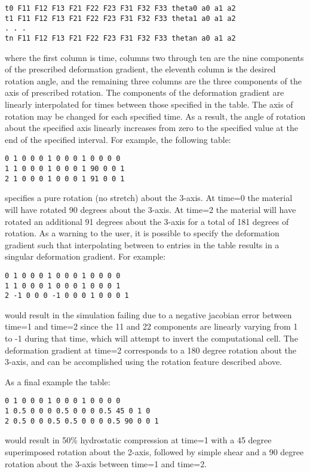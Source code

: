 \begin{Verbatim}
t0 F11 F12 F13 F21 F22 F23 F31 F32 F33 theta0 a0 a1 a2
t1 F11 F12 F13 F21 F22 F23 F31 F32 F33 theta1 a0 a1 a2
. . .
tn F11 F12 F13 F21 F22 F23 F31 F32 F33 thetan a0 a1 a2

\end{Verbatim}
where the first column is time, columns two through ten are the nine components of the prescribed deformation gradient, the eleventh column is the desired rotation angle, and the remaining three columns are the three components of the axis of prescribed rotation.  The components of the deformation gradient are linearly interpolated for times between those specified in the table.  The axis of rotation may be changed for each specified time.  As a result, the angle of rotation about the specified axis linearly increases from zero to the specified value at the end of the specified interval.  For example, the following table:

\begin{Verbatim}
0 1 0 0 0 1 0 0 0 1 0 0 0 0
1 1 0 0 0 1 0 0 0 1 90 0 0 1
2 1 0 0 0 1 0 0 0 1 91 0 0 1
\end{Verbatim}
specifies a pure rotation (no stretch) about the 3-axis.  At time=0 the material will have rotated 90 degrees about the 3-axis.  At time=2 the material will have rotated an additional 91 degrees about the 3-axis for a total of 181 degrees of rotation.  As a warning to the user, it is possible to specify the deformation gradient such that interpolating between to entries in the table results in a singular deformation gradient.  For example:
\begin{Verbatim}
0 1 0 0 0 1 0 0 0 1 0 0 0 0
1 1 0 0 0 1 0 0 0 1 0 0 0 1
2 -1 0 0 0 -1 0 0 0 1 0 0 0 1
\end{Verbatim}
would result in the simulation failing due to a negative jacobian error between time=1 and time=2 since the 11 and 22 components are linearly varying from 1 to -1 during that time, which will attempt to invert the computational cell.  The deformation gradient at time=2 corresponds to a 180 degree rotation about the 3-axis, and can be accomplished using the rotation feature described above.

As a final example the table:
\begin{Verbatim}
0 1 0 0 0 1 0 0 0 1 0 0 0 0
1 0.5 0 0 0 0.5 0 0 0 0.5 45 0 1 0
2 0.5 0 0 0.5 0.5 0 0 0 0.5 90 0 0 1
\end{Verbatim}
would result in 50\% hydrostatic compression at time=1 with a 45 degree superimposed rotation about the 2-axis, followed by  simple shear and a 90 degree rotation about the 3-axis between time=1 and time=2.


